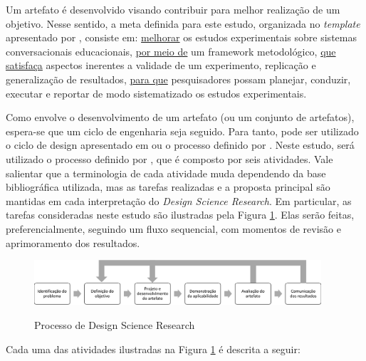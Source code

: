 Um artefato é desenvolvido visando contribuir para melhor realização de um objetivo. Nesse sentido, a meta definida para este estudo, organizada no \textit{template} apresentado por , consiste em: \underline{melhorar} os estudos experimentais sobre sistemas conversacionais educacionais, \underline{por meio de} um framework metodológico, \underline{que satisfaça} aspectos inerentes a validade de um experimento, replicação e generalização de resultados, \underline{para que} pesquisadores possam planejar, conduzir, executar e reportar de modo sistematizado os estudos experimentais. %

Como envolve o desenvolvimento de um artefato (ou um conjunto de artefatos), espera-se que um ciclo de engenharia seja seguido. Para tanto, pode ser utilizado o ciclo de design apresentado em  ou o processo definido por . Neste estudo, será utilizado o processo definido por , que é composto por seis atividades. Vale salientar que a terminologia de cada atividade muda dependendo da base bibliográfica utilizada, mas as tarefas realizadas e a proposta principal são mantidas em cada interpretação do \textit{Design Science Research}. Em particular, as tarefas consideradas neste estudo são ilustradas pela Figura \ref{processoDSR}. Elas serão feitas, preferencialmente, seguindo um fluxo sequencial, com momentos de revisão e aprimoramento dos resultados.

\begin{figure}[!htb]
\centering
\caption{Processo de Design Science Research}
\includegraphics[width=0.95\textwidth]{Figuras/ProcessoDSR.pdf}
\label{processoDSR}
\end{figure}

Cada uma das atividades ilustradas na Figura \ref{processoDSR} é descrita a seguir:

